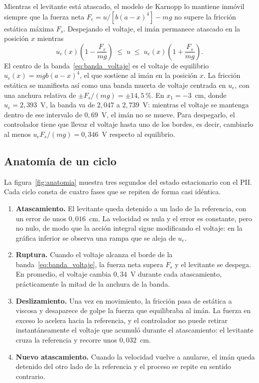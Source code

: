 Mientras el levitante está atascado, el modelo de Karnopp lo mantiene inmóvil siempre que la fuerza neta $F_e = u/[b(a-x)^4] - mg$ no supere la fricción estática máxima $F_s$. Despejando el voltaje, el imán permanece atascado en la posición $x$ mientras
\begin{equation}
u_e(x)\left(1-\frac{F_s}{mg}\right) \;\le\; u \;\le\; u_e(x)\left(1+\frac{F_s}{mg}\right) .
\label{eq:banda_voltaje}
\end{equation}
El centro de la banda~\eqref{eq:banda_voltaje} es el voltaje de equilibrio $u_e(x)=mgb(a-x)^4$, el que sostiene al imán en la posición $x$. La fricción estática se manifiesta así como una banda muerta de voltaje centrada en $u_e$, con una anchura relativa de $\pm F_s/(mg)=\pm14{,}5$\,\%. En $x_1=-3$~cm, donde $u_e=2{,}393$~V, la banda va de $2{,}047$ a $2{,}739$~V: mientras el voltaje se mantenga dentro de ese intervalo de $0{,}69$~V, el imán no se mueve. Para despegarlo, el controlador tiene que llevar el voltaje hasta uno de los bordes, es decir, cambiarlo al menos $u_e F_s/(mg)=0{,}346$~V respecto al equilibrio.

\subsection{Anatomía de un ciclo}

La figura~\ref{fig:anatomia} muestra tres segundos del estado estacionario con el PII. Cada ciclo consta de cuatro fases que se repiten de forma casi idéntica.

\begin{enumerate}
  \item \textbf{Atascamiento.} El levitante queda detenido a un lado de la referencia, con un error de unos $0{,}016$~cm. La velocidad es nula y el error es constante, pero no nulo, de modo que la acción integral sigue modificando el voltaje: en la gráfica inferior se observa una rampa que se aleja de $u_e$.
  \item \textbf{Ruptura.} Cuando el voltaje alcanza el borde de la banda~\eqref{eq:banda_voltaje}, la fuerza neta supera $F_s$ y el levitante se despega. En promedio, el voltaje cambia $0{,}34$~V durante cada atascamiento, prácticamente la mitad de la anchura de la banda.
  \item \textbf{Deslizamiento.} Una vez en movimiento, la fricción pasa de estática a viscosa y desaparece de golpe la fuerza que equilibraba al imán. La fuerza en exceso lo acelera hacia la referencia, y el controlador no puede retirar instantáneamente el voltaje que acumuló durante el atascamiento: el levitante cruza la referencia y recorre unos $0{,}032$~cm.
  \item \textbf{Nuevo atascamiento.} Cuando la velocidad vuelve a anularse, el imán queda detenido del otro lado de la referencia y el proceso se repite en sentido contrario.
\end{enumerate}

